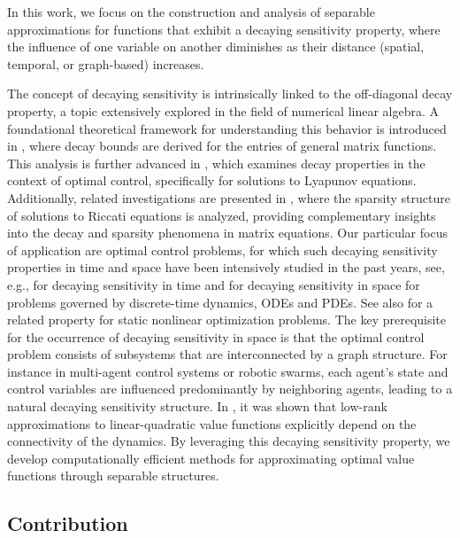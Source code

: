 \documentclass{article}
\begin{document}
In this work, we focus on the construction and analysis of separable approximations for functions that exhibit a decaying sensitivity property, where the influence of one variable on another diminishes as their distance (spatial, temporal, or graph-based) increases.

The concept of decaying sensitivity is intrinsically linked to the off-diagonal decay property, a topic extensively explored in the field of numerical linear algebra. A foundational theoretical framework for understanding this behavior is introduced in \cite{benzi2016localization}, where decay bounds are derived for the entries of general matrix functions. This analysis is further advanced in \cite{haber2016}, which examines decay properties in the context of optimal control, specifically for solutions to Lyapunov equations. Additionally, related investigations are presented in \cite{massei2024data}, where the sparsity structure of solutions to Riccati equations is analyzed, providing complementary insights into the decay and sparsity phenomena in matrix equations.
Our particular focus of application are optimal control problems, for which such decaying sensitivity properties in time and space have been intensively studied in the past years, see, e.g., \cite{shin2021controllability,na2020exponential,GrSS20} for decaying sensitivity in time and \cite{shin2022lqr,zhang2023optimal,qu2022scalableReinforcement,gottlich2024perturbations} for decaying sensitivity in space for problems governed by discrete-time dynamics, ODEs and PDEs. See also \cite{shin2022expDecay} for a related property for static nonlinear optimization problems. The key prerequisite for the occurrence of decaying sensitivity in space is that the optimal control problem consists of subsystems that are interconnected by a graph structure. For instance in multi-agent control systems or robotic swarms, each agent's state and control variables are influenced predominantly by neighboring agents, leading to a natural decaying sensitivity structure. In \cite{DKK21}, it was shown that low-rank approximations to linear-quadratic value functions explicitly depend on the connectivity of the dynamics. By leveraging this decaying sensitivity property, we develop computationally efficient methods for approximating optimal value functions through separable structures. 

\subsection{Contribution}
\end{document}
